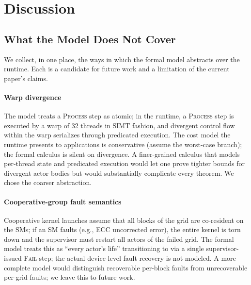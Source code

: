 \section{Discussion}
\label{sec:discussion}

\subsection{What the Model Does Not Cover}
\label{sec:disc:limits}

We collect, in one place, the ways in which the formal model
abstracts over the runtime.  Each is a candidate for future work
and a limitation of the current paper's claims.

\paragraph{Warp divergence}
The model treats a \textsc{Process} step as atomic; in the runtime,
a \textsc{Process} step is executed by a warp of 32 threads in SIMT
fashion, and divergent control flow within the warp serializes
through predicated execution.  The cost model the runtime presents
to applications is conservative (assume the worst-case branch);
the formal calculus is silent on divergence.  A finer-grained
calculus that models per-thread state and predicated execution
would let one prove tighter bounds for divergent actor bodies but
would substantially complicate every theorem.  We chose the
coarser abstraction.

\paragraph{Cooperative-group fault semantics}
Cooperative kernel launches assume that all blocks of the grid are
co-resident on the SMs; if an SM faults (e.g., ECC uncorrected
error), the entire kernel is torn down and the supervisor must
restart all actors of the failed grid.  The formal model treats
this as ``every actor's life'' transitioning to \Failed{} via a
single supervisor-issued \textsc{Fail} step; the actual
device-level fault recovery is not modeled.  A more complete
model would distinguish recoverable per-block faults from
unrecoverable per-grid faults; we leave this to future work.

